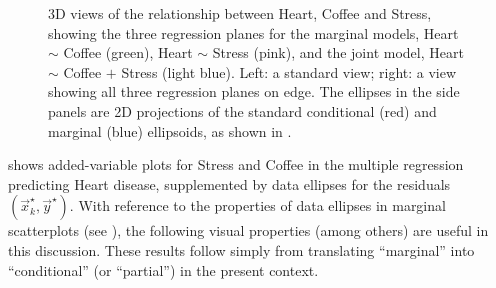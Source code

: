 \begin{figure}[htb]
\begin{minipage}[b]{.49\linewidth}
 \end{minipage}
  \caption{3D views of the relationship between Heart, Coffee and Stress, showing the three regression planes
  for the marginal models, Heart $\sim$ Coffee (green), Heart $\sim$ Stress (pink), and the joint model, Heart $\sim$ Coffee $+$ Stress (light blue).
  Left: a standard view; right: a view showing all three regression planes on edge.
  The ellipses in the side panels are 2D projections of the standard conditional (red) and marginal (blue) ellipsoids, as shown in .
  }
  \label{fig:coffee-av3D}
\end{figure}


 shows added-variable plots for Stress and Coffee in the multiple regression predicting Heart disease,
supplemented by data ellipses for the residuals $(\vec{x}_k^\star, \vec{y}^\star)$.  With reference to the properties
of data ellipses in marginal scatterplots (see ), the following visual properties (among others)
are useful in this discussion.  These results follow simply from translating ``marginal'' into ``conditional'' (or ``partial'')
in the present context.

